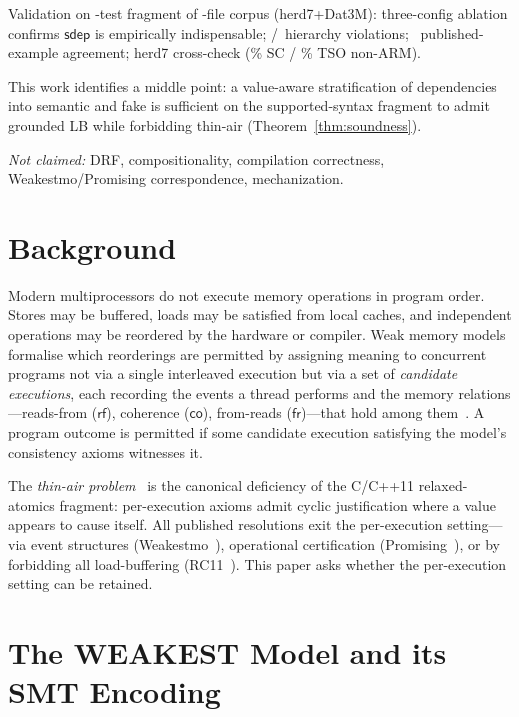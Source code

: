 \documentclass{llncs}
\newcommand{\sdep}{\mathsf{sdep}}
\newcommand{\rf}{\mathsf{rf}}
\newcommand{\co}{\mathsf{co}}
\newcommand{\fr}{\mathsf{fr}}
\begin{document}
Validation on \CorpusSize-test fragment of \CorpusFilesTotal-file corpus (herd7+Dat3M): three-config ablation confirms $\sdep$ is empirically indispensable; \HierarchyViolations/\CorpusSize~hierarchy violations; \PublishedExampleAgreement~published-example agreement; herd7 cross-check (\HerdNonArmSCPercent\% SC / \HerdNonArmTSOPercent\% TSO non-ARM).

This work identifies a middle point: a value-aware stratification of dependencies into semantic and fake is sufficient on the supported-syntax fragment to admit grounded LB while forbidding thin-air (Theorem~\ref{thm:soundness}).

\noindent\textit{Not claimed:} DRF, compositionality, compilation correctness, Weakestmo/Promising correspondence, mechanization.


\section{Background}
\label{sec:background}

Modern multiprocessors do not execute memory operations in program order.
Stores may be buffered, loads may be satisfied from local caches, and
independent operations may be reordered by the hardware or compiler. Weak
memory models formalise which reorderings are permitted by assigning meaning
to concurrent programs not via a single interleaved execution but via a set of
\emph{candidate executions}, each recording the events a thread performs and
the memory relations---reads-from ($\rf$), coherence ($\co$), from-reads
($\fr$)---that hold among
them~\cite{boehmAdve2008foundations,batty2015problem}. A program outcome is
permitted if some candidate execution satisfying the model's consistency axioms
witnesses it.

The \emph{thin-air problem}~\cite{boehmDemsky2014outlawing} is the canonical
deficiency of the C/C++11 relaxed-atomics fragment: per-execution axioms admit
cyclic justification where a value appears to cause itself. All published
resolutions exit the per-execution setting---via event structures
(Weakestmo~\cite{chakraborty2019grounding}), operational certification
(Promising~\cite{kang2017promising}), or by forbidding all load-buffering
(RC11~\cite{lahav2017repairing}). This paper asks whether the per-execution
setting can be retained.


\section{The WEAKEST Model and its SMT Encoding}
\label{sec:programs}
\end{document}
